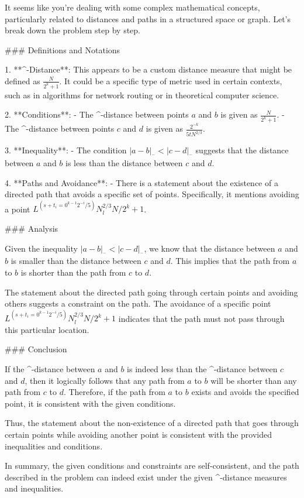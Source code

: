It seems like you're dealing with some complex mathematical concepts, particularly related to distances and paths in a structured space or graph. Let's break down the problem step by step.

### Definitions and Notations

1. **^-Distance**: This appears to be a custom distance measure that might be defined as \( \frac{N}{2^k + 1} \). It could be a specific type of metric used in certain contexts, such as in algorithms for network routing or in theoretical computer science.

2. **Conditions**:
   - The ^-distance between points \(a\) and \(b\) is given as \( \frac{N}{2^k + 1} \).
   - The ^-distance between points \(c\) and \(d\) is given as \( \frac{2^{-k}}{5tN^{2/3}} \).

3. **Inequality**:
   - The condition \( |a-b|_{^-} < |c-d|_{^-} \) suggests that the distance between \(a\) and \(b\) is less than the distance between \(c\) and \(d\).

4. **Paths and Avoidance**:
   - There is a statement about the existence of a directed path that avoids a specific set of points. Specifically, it mentions avoiding a point \(L^{(s+t_i=0^{k-1}2^{-i}/5)}N^{2/3}_lN/2^k+1\).

### Analysis

Given the inequality \( |a-b|_{^-} < |c-d|_{^-} \), we know that the distance between \(a\) and \(b\) is smaller than the distance between \(c\) and \(d\). This implies that the path from \(a\) to \(b\) is shorter than the path from \(c\) to \(d\).

The statement about the directed path going through certain points and avoiding others suggests a constraint on the path. The avoidance of a specific point \(L^{(s+t_i=0^{k-1}2^{-i}/5)}N^{2/3}_lN/2^k+1\) indicates that the path must not pass through this particular location.

### Conclusion

If the ^-distance between \(a\) and \(b\) is indeed less than the ^-distance between \(c\) and \(d\), then it logically follows that any path from \(a\) to \(b\) will be shorter than any path from \(c\) to \(d\). Therefore, if the path from \(a\) to \(b\) exists and avoids the specified point, it is consistent with the given conditions.

Thus, the statement about the non-existence of a directed path that goes through certain points while avoiding another point is consistent with the provided inequalities and conditions.

In summary, the given conditions and constraints are self-consistent, and the path described in the problem can indeed exist under the given ^-distance measures and inequalities.